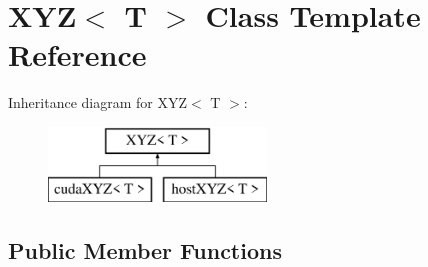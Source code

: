 \hypertarget{classXYZ}{}\section{X\+YZ$<$ T $>$ Class Template Reference}
\label{classXYZ}
Inheritance diagram for X\+YZ$<$ T $>$\+:\begin{figure}[H]
\begin{center}
\leavevmode
\includegraphics[height=2.000000cm]{classXYZ}
\end{center}
\end{figure}
\subsection*{Public Member Functions}
